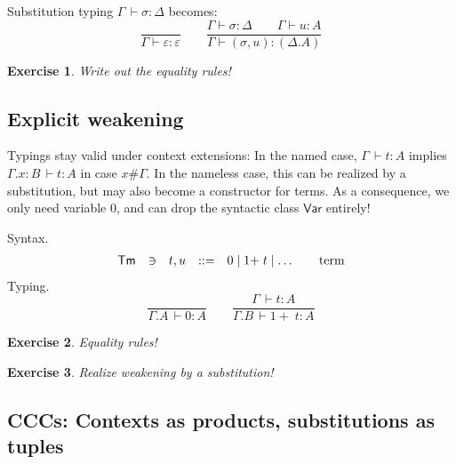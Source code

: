 \documentclass[a4paper,fleqn]{scrartcl}
\newtheorem{exercise}{Exercise}
\newcommand{\der}{\,\vdash}
\newcommand{\ru}[2]{\dfrac{#1}{#2}}
\newcommand{\Var}{\mathsf{Var}}
\newcommand{\Tm}{\mathsf{Tm}}
\newcommand{\GD}{\ensuremath{\Delta}}
\newcommand{\Ge}{\ensuremath{\varepsilon}}
\newcommand{\Gs}{\ensuremath{\sigma}}
\begin{document}
Substitution typing $\Gamma \der \sigma : \Delta$ becomes:
\[
  \ru{}{\Gamma \vdash \Ge : \Ge}
\qquad
  \ru{\Gamma \vdash \Gs : \GD \qquad \Gamma \vdash u : A
     }{\Gamma \vdash (\Gs,u) : (\GD.A)
     }
\]
\begin{exercise}
Write out the equality rules!
\end{exercise}


\subsection{Explicit weakening}

Typings stay valid under context extensions: In the named case, $\Gamma \der t : A$ implies $\Gamma.x{:}B \der t : A$ in case $x \# \Gamma$.  In the nameless case, this can be realized by a substitution, but may also become a constructor for terms.  As a consequence, we only need variable $0$, and can drop the syntactic class $\Var$ entirely!

Syntax.
\[
\begin{array}{lllrl@{\qquad}l}
\Tm & \ni & t,u & ::= & 0 \mid 1{+}\;t \mid \dots & \mbox{term} \\
\end{array}
\]
Typing.
\[
  \ru{}{\Gamma.A \der 0 : A}
\qquad
  \ru{\Gamma \der t : A}{\Gamma.B \der {1+}\; t : A}
\]
\begin{exercise}
Equality rules!
\end{exercise}
\begin{exercise}
Realize weakening by a substitution!
\end{exercise}


\subsection{CCCs: Contexts as products, substitutions as tuples}
\end{document}
